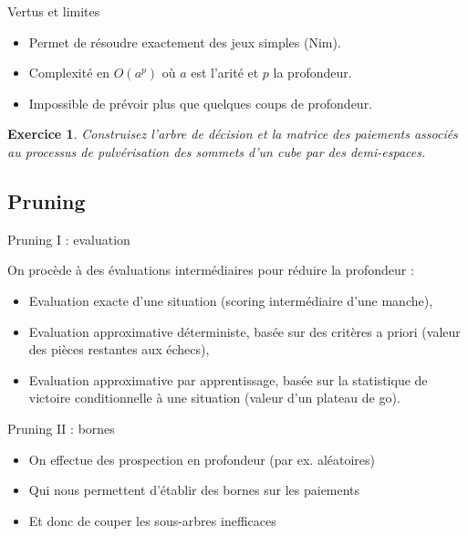 \documentclass[11pt]{beamer}
\newtheorem{exercice}{Exercice}
\begin{document}
\begin{frame}{Vertus et limites}

\begin{itemize}
	\item Permet de résoudre exactement des jeux simples (Nim).
	\vspace{0.2cm}
	\pause
	\item Complexité en $O(a^p)$ où $a$ est l'arité et $p$ la profondeur.
	\vspace{0.2cm}
	\pause
	\item Impossible de prévoir plus que quelques coups de profondeur.
\end{itemize}
\end{frame}

\begin{frame}

\begin{exercice}
Construisez l'arbre de décision et la matrice des paiements associés au processus de pulvérisation des sommets d'un cube par des demi-espaces. 
\end{exercice}

\end{frame}

\subsection{Pruning}


\begin{frame}{Pruning I : evaluation}

On procède à des évaluations intermédiaires pour réduire la profondeur :
\begin{itemize}
	\item Evaluation exacte d'une situation (scoring intermédiaire d'une manche),
	\item Evaluation approximative déterministe, basée sur des critères a priori (valeur des pièces restantes aux échecs),
	\item Evaluation approximative par apprentissage, basée sur la statistique de victoire conditionnelle à une situation (valeur d'un plateau de go).
\end{itemize}

\end{frame}

\begin{frame}{Pruning II : bornes}
\begin{itemize}
	\item On effectue des prospection en profondeur (par ex. aléatoires)
	\item Qui nous permettent d'établir des bornes sur les paiements
	\item Et donc de couper les sous-arbres inefficaces
\end{itemize}

\end{frame}
\end{document}
